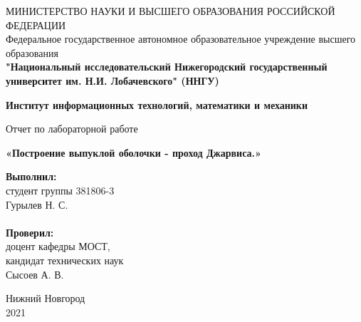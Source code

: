 \documentclass{report}
\begin{document}
\begin{titlepage}

\begin{center}
МИНИСТЕРСТВО НАУКИ И ВЫСШЕГО ОБРАЗОВАНИЯ РОССИЙСКОЙ ФЕДЕРАЦИИ\\
Федеральное государственное автономное образовательное учреждение высшего образования \\
\textbf{"Национальный исследовательский Нижегородский государственный университет им. Н.И. Лобачевского" (ННГУ)}
\end{center}

\begin{center}
\textbf{Институт информационных технологий, математики и механики}
\end{center}

\vspace{4em}

\begin{center}
Отчет по лабораторной работе \\
\end{center}
\begin{center}
\textbf{\Large«Построение выпуклой оболочки - проход Джарвиса.»} \\
\end{center}

\vspace{4em}

\newbox{\lbox}
\newlength{\maxl}
\setlength{\maxl}{\wd\lbox}
\hfill\parbox{7cm}{
\hspace*{5cm}\hspace*{-5cm}\textbf{Выполнил:} \\ студент группы 381806-3 \\ Гурылев Н. С.\\
\\
\hspace*{5cm}\hspace*{-5cm}\textbf{Проверил:}\\ доцент кафедры МОСТ, \\ кандидат технических наук \\ Сысоев А. В.\\
}
\vspace{\fill}

\begin{center} Нижний Новгород \\ 2021 \end{center}

\end{titlepage}
\end{document}
